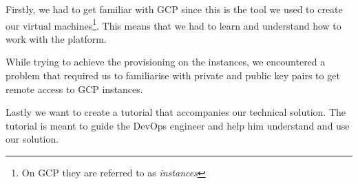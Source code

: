 Firstly, we had to get familiar with GCP since this is the tool we
used to create our virtual machines\footnote{On GCP they are referred
to as \textit{instances}}. This means that we had to learn and
understand how to work with the platform.

While trying to achieve the provisioning on the instances, we
encountered a problem that required us to familiarise with private and
public key pairs to get remote access to GCP instances.

Lastly we want to create a tutorial that accompanies our technical
solution.  The tutorial is meant to guide the DevOps engineer and help
him understand and use our solution. 
